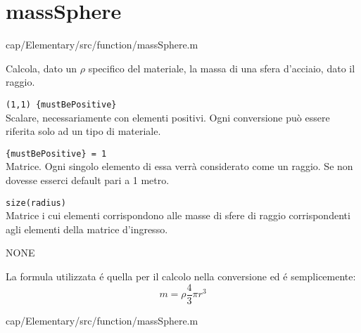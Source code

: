 \section{massSphere}\label{fnc:massSphere}


{cap/Elementary/src/function/massSphere.m}

Calcola, dato un $\rho$ specifico del materiale, la massa di una 
sfera d'acciaio, dato il raggio.


\begin{tcolorbox}
\begin{description}
\setlength{\itemindent}{-.2in}
   
   \item[\textit{rho}] \verb|(1,1) {mustBePositive}|\\
    Scalare, necessariamente con elementi positivi. Ogni conversione può essere 
    riferita solo ad un tipo di materiale.
    
    \item[\textit{radius}] \verb|{mustBePositive} = 1|\\
    Matrice. Ogni singolo elemento di essa verrà considerato come un 
    raggio. Se non dovesse esserci default pari a 1 
    metro.
\end{description}
\end{tcolorbox}

\begin{tcolorbox}
    \begin{description}   
\setlength{\itemindent}{-.2in} 

        \item[\textit{mass}] \verb|size(radius)|\\
        Matrice i cui elementi corrispondono alle masse di sfere di raggio 
        corrispondenti agli elementi della matrice d'ingresso.
    \end{description}  
\end{tcolorbox}

{\color{gray} NONE}

La formula utilizzata é quella per il calcolo nella conversione 
ed é semplicemente: 
$$m=\rho\frac{4}{3}\pi r^3$$

{cap/Elementary/src/function/massSphere.m}
\pagebreak


